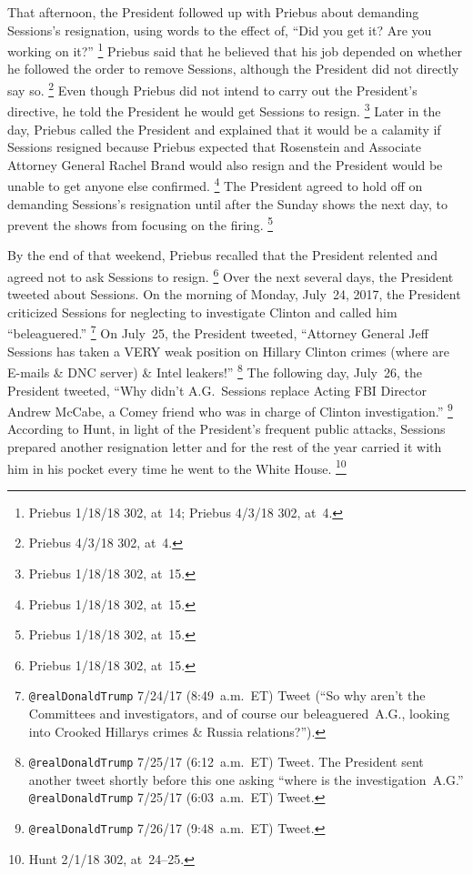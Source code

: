 That afternoon, the President followed up with Priebus about demanding Sessions's resignation, using words to the effect of, ``Did you get it?
Are you working on it?''%
\footnote{Priebus 1/18/18 302, at~14;
Priebus 4/3/18 302, at~4.}
Priebus said that he believed that his job depended on whether he followed the order to remove Sessions, although the President did not directly say so.%
\footnote{Priebus 4/3/18 302, at~4.}
Even though Priebus did not intend to carry out the President's directive, he told the President he would get Sessions to resign.%
\footnote{Priebus 1/18/18 302, at~15.}
Later in the day, Priebus called the President and explained that it would be a calamity if Sessions resigned because Priebus expected that Rosenstein and Associate Attorney General Rachel Brand would also resign and the President would be unable to get anyone else confirmed.%
\footnote{Priebus 1/18/18 302, at~15.}
The President agreed to hold off on demanding Sessions's resignation until after the Sunday shows the next day, to prevent the shows from focusing on the firing.%
\footnote{Priebus 1/18/18 302, at~15.}

By the end of that weekend, Priebus recalled that the President relented and agreed not to ask Sessions to resign.%
\footnote{Priebus 1/18/18 302, at~15.}
Over the next several days, the President tweeted about Sessions.
On the morning of Monday, July~24, 2017, the President criticized Sessions for neglecting to investigate Clinton and called him ``beleaguered.''%
\footnote{\verb+@realDonaldTrump+ 7/24/17 (8:49~a.m.~ET) Tweet (``So why aren't the Committees and investigators, and of course our beleaguered~A.G., looking into Crooked Hillarys crimes \& Russia relations?'').}
On July~25, the President tweeted, ``Attorney General Jeff Sessions has taken a VERY weak position on Hillary Clinton crimes (where are E-mails \& DNC server) \& Intel leakers!''%
\footnote{\verb+@realDonaldTrump+ 7/25/17 (6:12~a.m.~ET) Tweet.
The President sent another tweet shortly before this one asking ``where is the investigation~A.G.''
\verb+@realDonaldTrump+ 7/25/17 (6:03~a.m.~ET) Tweet.}
The following day, July~26, the President tweeted, ``Why didn't A.G.~Sessions replace Acting FBI Director Andrew McCabe, a Comey friend who was in charge of Clinton investigation.''%
\footnote{\verb+@realDonaldTrump+ 7/26/17 (9:48~a.m.~ET) Tweet.}
According to Hunt, in light of the President's frequent public attacks, Sessions prepared another resignation letter and for the rest of the year carried it with him in his pocket every time he went to the White House.%
\footnote{Hunt 2/1/18 302, at~24--25.}

